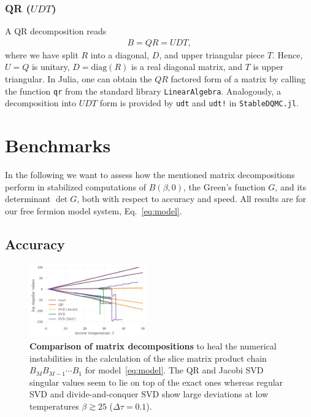 \documentclass[%
 reprint,
superscriptaddress,
citeautoscript,
showpacs,
 amsmath,amssymb,
 aps,
 prb,
longbibliography,
]{revtex4-2}
\begin{document}
\subsubsection{QR ($UDT$)}
A QR decomposition reads
\begin{align}
B = QR = UDT,
\end{align}
where we have split $R$ into a diagonal, $D$, and upper triangular piece $T$. Hence, $U = Q$ is unitary, $D = \textrm{diag}(R)$ is a real diagonal matrix, and $T$ is upper triangular. In Julia, one can obtain the $QR$ factored form of a matrix by calling the function \texttt{qr} from the standard library \texttt{LinearAlgebra}. Analogously, a decomposition into $UDT$ form is provided by \texttt{udt} and \texttt{udt!} in \texttt{StableDQMC.jl}.

\section{Benchmarks}\label{sec:benchmarks}

In the following we want to assess how the mentioned matrix decompositions perform in stabilized computations of $B(\beta, 0)$, the Green's function $G$, and its determinant $\det G$, both with respect to accuracy and speed. All results are for our free fermion model system, Eq.~\ref{eq:model}.

\subsection{Accuracy}

\begin{figure}
	\includegraphics[width=0.45\textwidth]{figures/decomp_comparison_simple.pdf}
	\caption{\textbf{Comparison of matrix decompositions} to heal the numerical instabilities in the calculation of the slice matrix product chain $B_M B_{M-1} \cdots B_1$ for model~\eqref{eq:model}. The QR and Jacobi SVD singular values seem to lie on top of the exact ones whereas regular SVD and divide-and-conquer SVD show large deviations at low temperatures $\beta \gtrsim 25$ ($\Delta \tau = 0.1$). \label{fig:decomp_comparison_simple}}
\end{figure}
\end{document}
